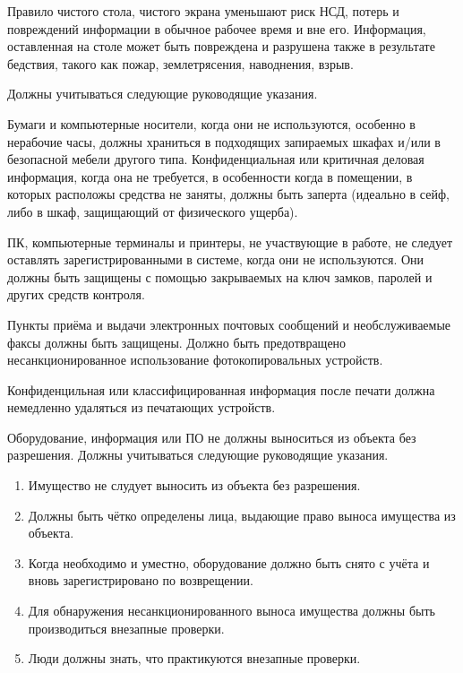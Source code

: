 \documentclass[12pt, russian, oneside, article]{ncc}
\begin{document}
Правило чистого стола, чистого экрана уменьшают риск НСД, потерь и повреждений информации в обычное рабочее время и вне его. Информация, оставленная на столе может быть повреждена и разрушена также в результате бедствия, такого как пожар, землетрясения, наводнения, взрыв.

Должны учитываться следующие руководящие указания.

Бумаги и компьютерные носители, когда они не используются, особенно в нерабочие часы, должны храниться в подходящих запираемых шкафах и/или в безопасной мебели другого типа. Конфиденциальная или критичная деловая информация, когда она не требуется, в особенности когда в помещении, в которых расположы средства не заняты, должны быть заперта (идеально в сейф, либо в шкаф, защищающий от физического ущерба).

ПК, компьютерные терминалы и принтеры, не участвующие в работе, не следует оставлять зарегистрированными в системе, когда они не используются. Они должны быть защищены с помощью закрываемых на ключ замков, паролей и других средств контроля.

Пункты приёма и выдачи электронных почтовых сообщений и необслуживаемые факсы должны быть защищены. Должно быть предотвращено несанкционированное использование фотокопировальных устройств.

Конфиденцильная или классифицированная информация после печати должна немедленно удаляться из печатающих устройств.

Оборудование, информация или ПО не должны выноситься из объекта без разрешения. Должны учитываться следующие руководящие указания.
\begin{enumerate}
\item Имущество не слудует выносить из объекта без разрешения.
\item Должны быть чётко определены лица, выдающие право выноса имущества из объекта.
\item Когда необходимо и уместно, оборудование должно быть снято с учёта и вновь зарегистрировано по возврещении.
\item Для обнаружения несанкционированного выноса имущества должны быть производиться внезапные проверки.
\item Люди должны знать, что практикуются внезапные проверки.
\end{enumerate}
\end{document}
